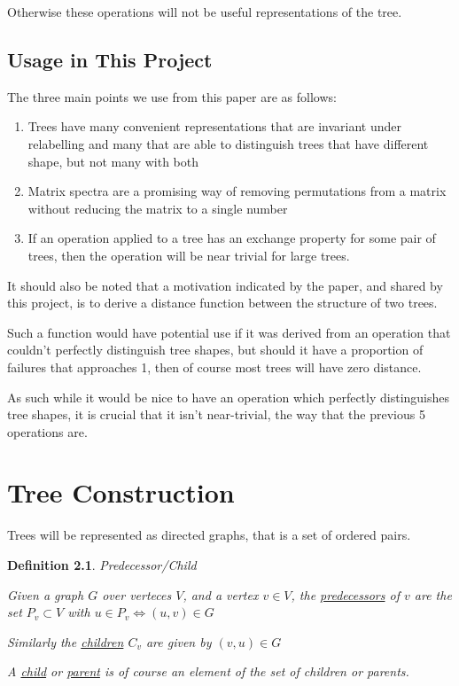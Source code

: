\documentclass[10pt,a4paper]{report}
\newtheorem{definition}{Definition}
\begin{document}
Otherwise these operations will not be useful representations of the tree.

\section{Usage in This Project}

The three main points we use from this paper are as follows:
\begin{enumerate}
	\item Trees have many convenient representations that are invariant under
		relabelling and many that are able to distinguish trees that have
		different shape, but not many with both
	\item Matrix spectra are a promising way of removing permutations from a
		matrix without reducing the matrix to a single number
	\item If an operation applied to a tree has an exchange property for some
		pair of trees, then the operation will be near trivial for large trees.
\end{enumerate}

It should also be noted that a motivation indicated by the paper, and shared by this project, is to derive a distance function between the structure of two trees.

Such a function would have potential use if it was derived from an operation that couldn't perfectly distinguish tree shapes, but should it have a proportion of failures that approaches 1, then of course most trees will have zero distance.

As such while it would be nice to have an operation which perfectly distinguishes tree shapes, it is crucial that it isn't near-trivial, the way that the previous 5 operations are.

\chapter{Tree Construction}

Trees will be represented as directed graphs, that is a set of ordered pairs.

\begin{definition} Predecessor/Child

	Given a graph $G$ over verteces $V$, and a vertex $v \in V$, the
	\underline{predecessors} of $v$ are the set $P_v \subset V$ with $u \in P_v
	\Leftrightarrow (u, v) \in G$

	Similarly the \underline{children} $C_v$ are given by $(v, u) \in G$

	A \underline{child} or \underline{parent} is of course an element of the
	set of children or parents.
\end{definition}
\end{document}

